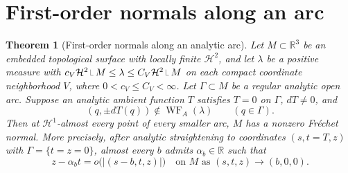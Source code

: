 \documentclass[11pt]{article}
\newtheorem{theorem}{Theorem}[section]
\newcommand{\R}{\mathbb R}
\newcommand{\HH}{\mathcal H}
\newcommand{\WF}{\operatorname{WF}_{A}}
\newcommand{\restr}{\mathbin{\vrule height 1.4ex depth 0pt width .06ex\vrule height .06ex depth 0pt width .65ex}}
\begin{document}
\section{First-order normals along an arc}\label{app:arc}\label{sec:arc}
\begin{theorem}[First-order normals along an analytic arc]\label{thm:arcnormal}
Let $M\subset\R^3$ be an embedded topological surface with locally finite $\HH^2$, and let $\lambda$ be a positive measure with
$c_V\HH^2\restr M\le\lambda\le C_V\HH^2\restr M$ on each compact coordinate neighborhood $V$, where $0<c_V\le C_V<\infty$.
Let $\Gamma\subset M$ be a regular analytic open arc. Suppose an analytic ambient function $T$ satisfies $T=0$ on $\Gamma$, $dT\ne0$, and
\[
 (q,\pm dT(q))\notin\WF(\lambda)\qquad(q\in\Gamma).
\]
Then at $\HH^1$-almost every point of every smaller arc, $M$ has a nonzero Fr\'echet normal. More precisely, after analytic straightening to coordinates $(s,t=T,z)$ with $\Gamma=\{t=z=0\}$, almost every $b$ admits $\alpha_b\in\R$ such that
\begin{equation}\label{arcfirstorder}
 z-\alpha_b t=o\bigl(|(s-b,t,z)|\bigr)\quad\text{on }M\text{ as }(s,t,z)\to(b,0,0).
\end{equation}
\end{theorem}
\end{document}
